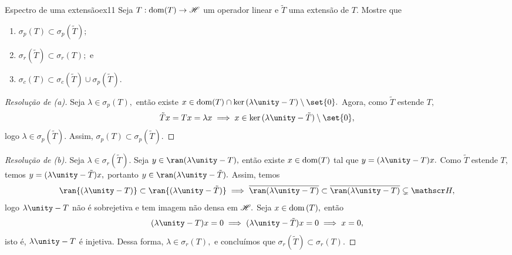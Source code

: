 \begin{exercício}{Espectro de uma extensão}{ex11}
    Seja \(T : \operatorname{dom}(T) \to \mathscr{H}\) um operador linear e \(\tilde{T}\) uma extensão de \(T\). Mostre que
    \begin{enumerate}[label=(\alph*)]
        \item \(\sigma_p(T) \subset \sigma_p(\tilde{T});\)
        \item \(\sigma_r(\tilde{T}) \subset \sigma_r(T);\) e
        \item \(\sigma_c(T) \subset \sigma_c(\tilde{T}) \cup \sigma_p(\tilde{T}).\)
    \end{enumerate}
\end{exercício}
\begin{proof}[Resolução de (a)]
  Seja \(\lambda \in \sigma_p(T),\) então existe \(x \in \dom(T)  \cap \ker{(\lambda \unity - T)} \setminus \set{0}.\) Agora, como \(\tilde{T}\) estende \(T,\)
  \begin{equation*}
    \tilde{T}x = Tx = \lambda x \implies x \in \ker{(\lambda \unity - \tilde{T})} \setminus \set{0},
  \end{equation*}
  logo \(\lambda \in \sigma_p(\tilde{T}).\) Assim, \(\sigma_p(T) \subset \sigma_p(\tilde{T}).\)
\end{proof}
\begin{proof}[Resolução de (b)]
  Seja \(\lambda \in \sigma_r(\tilde{T}).\) Seja \(y \in \ran(\lambda \unity - T),\) então existe \(x \in \operatorname{dom}(T)\) tal que \(y = (\lambda \unity - T)x.\) Como \(\tilde{T}\) estende \(T,\) temos
  \(y = (\lambda \unity - \tilde{T})x,\) portanto \(y \in \ran(\lambda \unity - \tilde{T}).\) Assim, temos
  \begin{equation*}
    \ran{(\lambda \unity - T)} \subset \ran{(\lambda \unity - \tilde{T})} \implies \closure{\ran(\lambda \unity - T)} \subset \closure{\ran(\lambda \unity - T)} \subsetneq \hilbert,
  \end{equation*}
  logo \(\lambda \unity - T\) não é sobrejetiva e tem imagem não densa em \(\mathscr{H}.\) Seja \(x \in \operatorname{dom}{(T)},\) então
  \begin{equation*}
    (\lambda \unity - T) x = 0 \implies (\lambda \unity - \tilde{T})x = 0 \implies x = 0,
  \end{equation*}
  isto é, \(\lambda \unity - T\) é injetiva. Dessa forma, \(\lambda \in \sigma_r(T),\) e concluímos que \(\sigma_r(\tilde{T}) \subset \sigma_r(T).\)
\end{proof}
